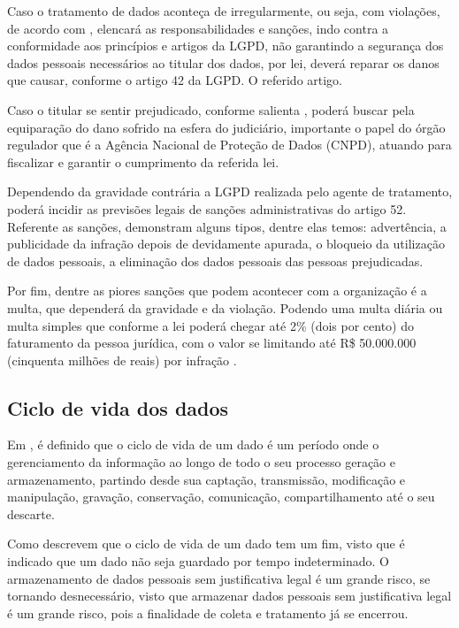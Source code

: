 \documentclass[
	12pt,				%
	openright,			%
	oneside,			%
	a4paper,			%
	english,			%
	french,				%
	spanish,			%
	brazil,				%
	]{abntex2}
\begin{document}
Caso o tratamento de dados aconteça de irregularmente, ou seja, com violações, de acordo com  , elencará as responsabilidades e sanções, indo contra a conformidade aos princípios e artigos da LGPD, não garantindo a segurança dos dados pessoais necessários ao titular dos dados, por lei, deverá reparar os danos que causar, conforme o artigo 42 da LGPD. O referido artigo. 

Caso o titular se sentir prejudicado, conforme salienta , poderá buscar pela equiparação do dano sofrido na esfera do judiciário, importante o papel do órgão regulador que é a Agência Nacional de Proteção de Dados (CNPD), atuando para fiscalizar e garantir o cumprimento da referida lei.

Dependendo da gravidade contrária a LGPD realizada pelo agente de tratamento, poderá incidir as previsões legais de sanções administrativas do artigo 52. Referente as sanções, \cite{Alves2020} demonstram alguns tipos, dentre elas temos: advertência, a publicidade da infração depois de devidamente apurada, o bloqueio da utilização de dados pessoais, a eliminação dos dados pessoais das pessoas prejudicadas. 

Por fim, dentre as piores sanções que podem acontecer com a organização é a multa, que dependerá da gravidade e da violação. Podendo uma multa diária ou multa simples que conforme a lei poderá chegar até 2\% (dois por cento) do faturamento da pessoa jurídica, com o valor se limitando até R\$ 50.000.000 (cinquenta milhões de reais) por infração \cite{01-01-LeiGeral}.
\subsection{Ciclo de vida dos dados}

Em \cite{Pinheiro2021}, é definido que o ciclo de vida de um dado é um período onde o gerenciamento da informação ao longo de todo o seu processo geração e armazenamento, partindo desde sua captação, transmissão, modificação e manipulação, gravação, conservação, comunicação, compartilhamento até o seu descarte.

Como descrevem  que o ciclo de vida de um dado tem um fim, visto que é indicado que um dado não seja guardado por tempo indeterminado. O armazenamento de dados pessoais sem justificativa legal é um grande risco, se tornando desnecessário, visto que armazenar dados pessoais sem justificativa legal é um grande risco, pois a finalidade de coleta e tratamento já se encerrou.
\end{document}
